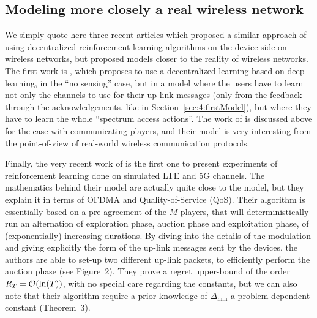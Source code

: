 


\subsection{Modeling more closely a real wireless network}
\label{sub:5:moreRealisticModels}

We simply quote here three recent articles which proposed a similar approach of using decentralized reinforcement learning algorithms on the device-side on wireless networks,
but proposed models closer to the reality of wireless networks.
%
The first work is \cite{NaparstekCohen17}, which proposes to use a decentralized learning based on deep learning, in the ``no sensing'' case, but in a model where the users have to learn not only the channels to use for their up-link messages (only from the feedback through the acknowledgements, like in Section~\ref{sec:4:firstModel}), but where they have to learn the whole ``spectrum access actions''.
%
%
The work of \cite{AvnerMannor18} is discussed above for the case with communicating players, and their model is very interesting from the point-of-view of real-world wireless communication protocols.

Finally, the very recent work of \cite{Zafaruddin2019} is the first one to present experiments of reinforcement learning done on simulated LTE and 5G channels.
The mathematics behind their model are actually quite close to the model, but they explain it in terms of OFDMA and Quality-of-Service (QoS).
Their algorithm is essentially based on a pre-agreement of the $M$ players, that will deterministically run an alternation of exploration phase, auction phase and exploitation phase, of (exponentially) increasing durations.
By diving into the details of the modulation and giving explicitly the form of the up-link messages sent by the devices, the authors are able to set-up two different up-link packets, to efficiently perform the auction phase (see Figure~2).
They prove a regret upper-bound of the order $R_T = \mathop{}\mathopen{}\mathcal{O}\mathopen{}\left(\ln(T)\right)$, with no special care regarding the constants, but we can also note that their algorithm require a prior knowledge of $\Delta_{\min}$ a problem-dependent constant (Theorem~3).


